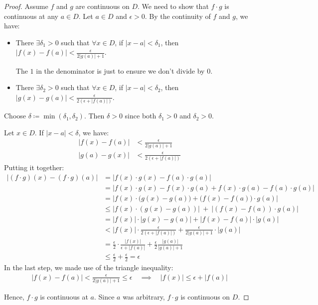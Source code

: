 \begin{proof}
    Assume $f$ and $g$ are continuous on $D$. We need to show that $f \cdot g$ is continuous at any $a \in D$. Let $a \in D$ and $\epsilon > 0$. By the continuity of $f$ and $g$, we have:

    \begin{itemize}
        \item There $\exists \delta_1 > 0$ such that
        $\forall x \in D$, if $|x - a| < \delta_1$,
        then $\displaystyle |f(x) - f(a)|
            < \frac{\epsilon}{2|g(a)| + 1}$.

        The $1$ in the denominator is just to ensure we don't divide by $0$.

        \item There $\exists \delta_2 > 0$ such that
        $\forall x \in D$, if $|x - a| < \delta_2$,
        then $\displaystyle |g(x) - g(a)|
            < \frac{\epsilon}{2(\epsilon + |f(a)|)}$.
    \end{itemize}

    Choose $\delta \coloneqq \min(\delta_1, \delta_2)$. Then $\delta > 0$ since both $\delta_1 > 0$ and $\delta_2 > 0$.
    
    Let $x\in D$. If $|x - a| < \delta$, we have:
    \begin{align*}
        |f(x) - f(a)| &< \frac{\epsilon}{2|g(a)| + 1}\\
        |g(a) - g(x)| &< \frac{\epsilon}{2(\epsilon + |f(a)|)}
    \end{align*}
    Putting it together:
    \begin{align*}
        |(f \cdot g)(x) - (f \cdot g)(a)|
        &= |f(x) \cdot g(x) - f(a) \cdot g(a)| \\
        &= |f(x) \cdot g(x) - f(x) \cdot g(a) + f(x) \cdot g(a) - f(a) \cdot g(a)| \\
        &= \bigl|f(x) \cdot \bigl(g(x) - g(a)\bigr)
            + \bigl(f(x) - f(a)\bigr) \cdot g(a) \bigr| \\
        &\leq \bigl|f(x) \cdot (g(x) - g(a)) \bigr|
            \: + \: \bigl|(f(x) - f(a)) \cdot g(a) \bigr| \\
        &= |f(x)| \cdot |g(x) - g(a)|+ |f(x) - f(a)| \cdot |g(a)|\\
        &< |f(x)| \cdot \frac{\epsilon}{2 (\epsilon + |f(a)|)} + \frac{\epsilon}{2 |g(a)| + 1} \cdot |g(a)| \\
        &= \frac{\epsilon}{2} \cdot \frac{|f(x)|}{\epsilon + |f(a)|}
            + \frac{\epsilon}{2} \frac{|g(a)|}{|g(a)| + 1} \\
        &\leq \frac{\epsilon}{2} + \frac{\epsilon}{2} = \epsilon
    \end{align*}
    In the last step, we made use of the triangle inequality:
    \begin{align}
        |f(x) - f(a)| < \frac{\epsilon}{2|g(a)| + 1} \leq \epsilon
        \quad \implies \quad
        |f(x)| \leq \epsilon + |f(a)|
    \end{align}

    Hence, $f \cdot g$ is continuous at $a$. Since $a$ was arbitrary, $f \cdot g$ is continuous on $D$.
\end{proof}
